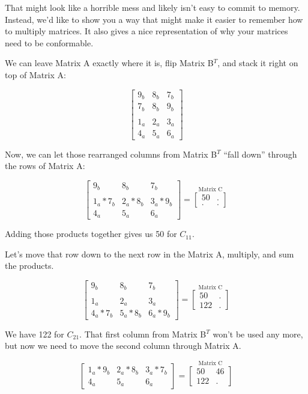 \documentclass[
  letterpaper,
]{krantz}
\begin{document}
That might look like a horrible mess and likely isn't easy to commit to
memory. Instead, we'd like to show you a way that might make it easier
to remember how to multiply matrices. It also gives a nice
representation of why your matrices need to be conformable.

We can leave Matrix A exactly where it is, flip Matrix B\(^T\), and
stack it right on top of Matrix A:

\[
\begin{bmatrix}
9_{b} & 8_{b} & 7_{b} \\
7_{b} & 8_{b} & 9_{b} \\
\\
1_{a} & 2_{a} & 3_{a} \\
4_{a} & 5_{a} & 6_{a}
\end{bmatrix}
\]

Now, we can let those rearranged columns from Matrix B\(^T\) ``fall
down'' through the rows of Matrix A:

\[
\begin{bmatrix}
9_{b} & 8_{b} & 7_{b} \\
\\
1_{a}*7_{b} & 2_{a}*8_{b} & 3_{a}*9_{b}\\
4_{a} & 5_{a} & 6_{a}
\end{bmatrix}
= 
\stackrel{\mbox{Matrix C}}{
\begin{bmatrix}
50 & .\\
. & .
\end{bmatrix}
}
\]

Adding those products together gives us 50 for \(C_{11}\).

Let's move that row down to the next row in the Matrix A, multiply, and
sum the products.

\[
\begin{bmatrix}
9_{b} & 8_{b} & 7_{b} \\
\\
1_{a} & 2_{a} & 3_{a}\\
4_{a}*7_{b} & 5_{a}*8_{b} & 6_{a}*9_{b}
\end{bmatrix}
= 
\stackrel{\mbox{Matrix C}}{
\begin{bmatrix}
50 & .\\
122 & .
\end{bmatrix}
}
\]

We have 122 for \(C_{21}\). That first column from Matrix B\(^T\) won't
be used any more, but now we need to move the second column through
Matrix A.

\[
\begin{bmatrix}
1_{a}*9_{b} & 2_{a}*8_{b} & 3_{a}*7_{b}\\
4_{a} & 5_{a} & 6_{a}
\end{bmatrix}
= 
\stackrel{\mbox{Matrix C}}{
\begin{bmatrix}
50 & 46\\
122 & .
\end{bmatrix}
}
\]
\end{document}
